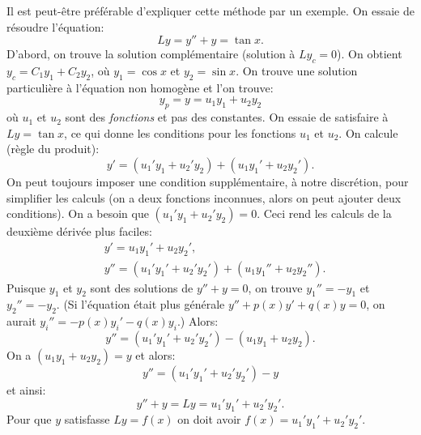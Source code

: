 Il est peut-être préférable d'expliquer cette méthode par un exemple. On essaie de résoudre l'équation:  
\begin{equation*}
Ly = y''+y = \tan x .
\end{equation*}
D'abord, on trouve la solution complémentaire (solution à $Ly_c = 0$).  
On obtient $y_c = C_1 y_1 + C_2 y_2$, où $y_1 = \cos x$ et $y_2 = \sin x$.
On trouve une solution particulière à l'équation non homogène et l'on trouve: 
\begin{equation*}
y_p = y = u_1 y_1 + u_2 y_2 
\end{equation*}
où $u_1$ et $u_2$ sont des \emph{fonctions} et pas des constantes.
On essaie de satisfaire à $Ly = \tan x$, ce qui donne les conditions pour les fonctions  $u_1$ et $u_2$.
On calcule (règle du produit):  
\begin{equation*}
y' = (u_1' y_1 + u_2' y_2) + (u_1 y_1' + u_2 y_2').
\end{equation*}
On peut toujours imposer une condition supplémentaire, à notre discrétion, pour simplifier les calculs (on a deux fonctions inconnues, alors on peut ajouter deux conditions). On a besoin que 
$(u_1' y_1 + u_2' y_2) = 0$.  Ceci rend les calculs de la deuxième dérivée plus faciles: 
\begin{align*}
& y' = u_1 y_1' + u_2 y_2' , \\
& y'' = (u_1' y_1' + u_2' y_2') + (u_1 y_1'' + u_2 y_2'') .
\end{align*}
Puisque $y_1$ et $y_2$ sont des solutions de $y''+y = 0$, on trouve 
$y_1'' = - y_1$
et $y_2'' = - y_2$.
(Si l'équation était plus générale  $y''+p(x)y' +q(x)y = 0$, on aurait
$y_i'' = -p(x)y_i' -q(x)y_i$.) Alors: 
\begin{equation*}
y'' = (u_1' y_1' + u_2' y_2') - (u_1 y_1 + u_2 y_2) .
\end{equation*}
On a $(u_1 y_1 + u_2 y_2) = y$ et alors:
\begin{equation*}
y'' = (u_1' y_1' + u_2' y_2') - y 
\end{equation*}
et ainsi: 
\begin{equation*}
y'' + y = Ly = u_1' y_1' + u_2' y_2' .
\end{equation*}
Pour  que $y$ satisfasse $Ly = f(x)$ on doit avoir
$f(x) = u_1' y_1' + u_2' y_2'$.

